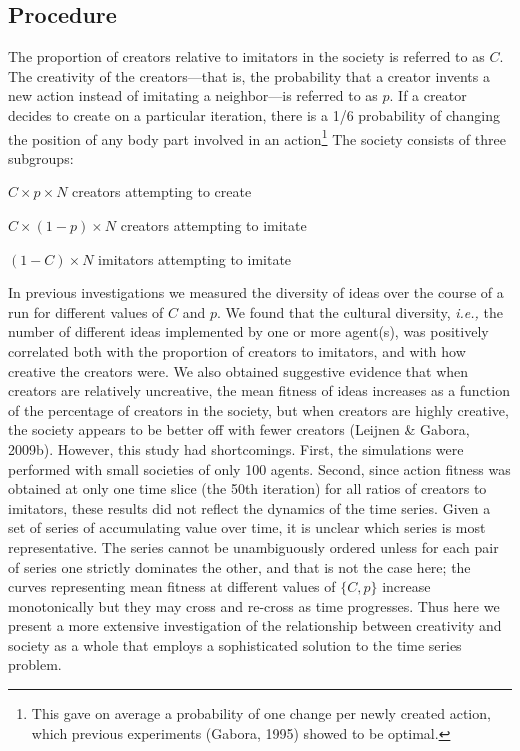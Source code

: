 \documentclass[a4paper,12pt,man,british]{apa6}
\begin{document}
\subsection{Procedure}
The proportion of creators relative to imitators in the society is referred to as $C$. The creativity of the creators---that is, the probability that a creator invents a new action instead of imitating a neighbor---is referred to as $p$. If a creator decides to create on a particular iteration, there is a 1/6 probability of changing the position of any body part involved in an action\footnote{This gave on average a probability of one change per newly created action, which previous experiments (Gabora, 1995) showed to be optimal.} The society consists of three subgroups:\\
\begin{APAenumerate}
\item {$C \times p \times N$} creators attempting to create\\
\item {$C \times (1-p) \times N$} creators attempting to imitate\\
\item {$(1-C) \times N$} imitators attempting to imitate\\
\end{APAenumerate}

In previous investigations we measured the diversity of ideas over the course of a run for different values of $C$ and $p$. We found that the cultural diversity, \emph{i.e.,} the number of different ideas implemented by one or more agent(s), was positively correlated both with the proportion of creators to imitators, and with how creative the creators were. We also obtained suggestive evidence that when creators are relatively uncreative, the mean fitness of ideas increases as a function of the percentage of creators in the society, but when creators are highly creative, the society appears to be better off with fewer creators (Leijnen \& Gabora, 2009b). However, this study had shortcomings. First, the simulations were performed with small societies of only 100 agents. Second, since action fitness was obtained at only one time slice (the 50th iteration) for all ratios of creators to imitators, these results did not reflect the dynamics of the time series. Given a set of series of accumulating value over time, it is unclear which series is most representative. The series cannot be unambiguously ordered unless for each pair of series one strictly dominates the other, and that is not the case here; the curves representing mean fitness at different values of $\{C, p\}$ increase monotonically but they may cross and re-cross as time progresses. Thus here we present a more extensive investigation of the relationship between creativity and society as a whole that employs a sophisticated solution to the time series problem.
\end{document}
